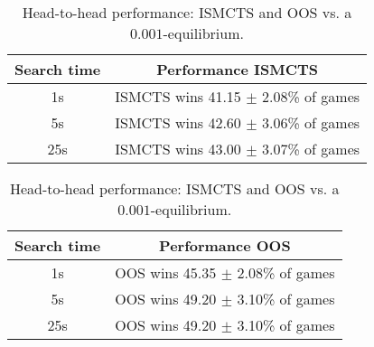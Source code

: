 \documentclass[letterpaper]{article}
\newcommand{\cI}{\mathcal{I}}
\begin{document}
\begin{table}[h!]
\begin{center}
\begin{tabular}{|c|c|}
\hline
Search time & Performance ISMCTS \\
\hline
    1s      & ISMCTS wins 41.15 $\pm$ 2.08\% of games \\
    5s      & ISMCTS wins 42.60 $\pm$ 3.06\% of games \\
    25s     & ISMCTS wins 43.00 $\pm$ 3.07\% of games \\
\hline
\end{tabular}

\vspace{0.3cm}

\begin{tabular}{|c|c|}
\hline
Search time & Performance OOS \\
\hline
    1s      & OOS wins 45.35 $\pm$ 2.08\% of games \\
    5s      & OOS wins 49.20 $\pm$ 3.10\% of games \\
    25s     & OOS wins 49.20 $\pm$ 3.10\% of games \\
\hline
\end{tabular}
\caption{Head-to-head performance: ISMCTS and OOS vs. a $0.001$-equilibrium. }
\end{center}
\end{table}

\end{document}
